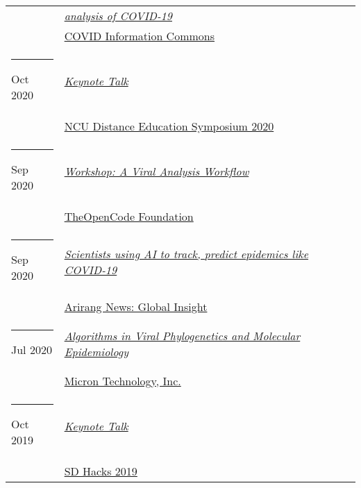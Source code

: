 \documentclass[margin,line]{res}
\begin{document}
\begin{resume}
\begin{longtable}{@{}p{0.7in}p{4in}}
\hspace*{-4mm} & \hspace{4mm} \href{https://www.youtube.com/watch?v=6-fDbTY8ySI}{\textit{analysis of COVID-19}}\\*
\hspace*{-4mm} & \hspace{4mm} \href{https://covidinfocommons.datascience.columbia.edu/}{COVID Information Commons}\\
\hspace*{-4mm} \rule{-1mm}{5mm} Oct 2020 & \href{http://distance.ncu.edu.jm/proposal_submission}{\textit{Keynote Talk}}\\*
\hspace*{-4mm} & \hspace{4mm} \href{http://distance.ncu.edu.jm/proposal_submission}{NCU Distance Education Symposium 2020}\\
\hspace*{-4mm} \rule{-1mm}{5mm} Sep 2020 & \href{https://www.theopencode.org/a-viral-analysis-workflow/}{\textit{Workshop: A Viral Analysis Workflow}}\\*
\hspace*{-4mm} & \hspace{4mm} \href{https://www.theopencode.org/}{TheOpenCode Foundation}\\
\hspace*{-4mm} \rule{-1mm}{5mm} Sep 2020 & \href{https://youtu.be/xHSFWtLL8bc}{\textit{Scientists using AI to track, predict epidemics like COVID-19}}\\*
\hspace*{-4mm} & \hspace{4mm} \href{https://www.arirang.com/}{Arirang News: Global Insight}\\
\hspace*{-4mm} \rule{-1mm}{5mm} Jul 2020 & \href{https://www.micron.com/}{\textit{Algorithms in Viral Phylogenetics and Molecular Epidemiology}}\\*
\hspace*{-4mm} & \hspace{4mm} \href{https://www.micron.com/}{Micron Technology, Inc.}\\
\hspace*{-4mm} \rule{-1mm}{5mm} Oct 2019 & \href{https://www.sdhacks.io/}{\textit{Keynote Talk}}\\*
\hspace*{-4mm} & \hspace{4mm} \href{https://www.sdhacks.io/}{SD Hacks 2019}\\

\end{longtable}
\end{resume}
\end{document}
